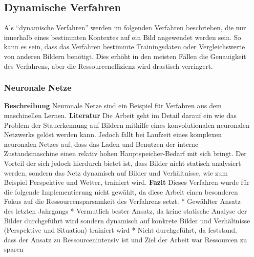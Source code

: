 \subsection{Dynamische Verfahren}
Als "`dynamische Verfahren"' werden im folgenden Verfahren beschrieben, die nur innerhalb eines bestimmten Kontextes auf ein Bild angewendet werden sein. So kann es sein, dass das Verfahren bestimmte Trainingsdaten oder Vergleichswerte von anderen Bildern benötigt. Dies erhöht in den meisten Fällen die Genauigkeit des Verfahrens, aber die Ressourceneffizienz wird drastisch verringert.
\subsubsection{Neuronale Netze}
\textbf{Beschreibung}\newline
Neuronale Netze sind ein Beispiel für Verfahren aus dem maschinellen Lernen. 
\newline\newline
\textbf{Literatur}\newline
Die Arbeit \cite{hkkDhbw} geht im Detail darauf ein wie das Problem der Stauerkennung auf Bildern mithilfe eines konvolutionalen neuronalen Netzwerks gelöst werden kann. 
Jedoch fällt bei Laufzeit eines komplexen neuronalen Netzes auf, dass das Laden und Benutzen der interne Zustandsmaschine einen relativ hohen Hauptspeicher-Bedarf mit sich bringt.
Der Vorteil der sich jedoch hierdurch bietet ist, dass Bilder nicht statisch analysiert werden, sondern das Netz dynamisch auf Bilder und Verhältnisse, wie zum Beispiel Perspektive und Wetter, trainiert wird.
\newline\newline
\textbf{Fazit}\newline
Dieses Verfahren wurde für die folgende Implementierung nicht gewählt, da diese Arbeit einen besonderen Fokus auf die Ressourcensparsamkeit des Verfahrens setzt.
* Gewählter Ansatz des letzten Jahrgangs\newline
* Vermutlich bester Ansatz, da keine statische Analyse der Bilder durchgeführt wird\newline
	sondern dynamisch auf konkrete Bilder und Verhältnisse (Perspektive und Situation) trainiert wird
* Nicht durchgeführt, da feststand, dass der Ansatz zu Ressourcenintensiv ist und Ziel der Arbeit war Ressourcen zu sparen\newline

